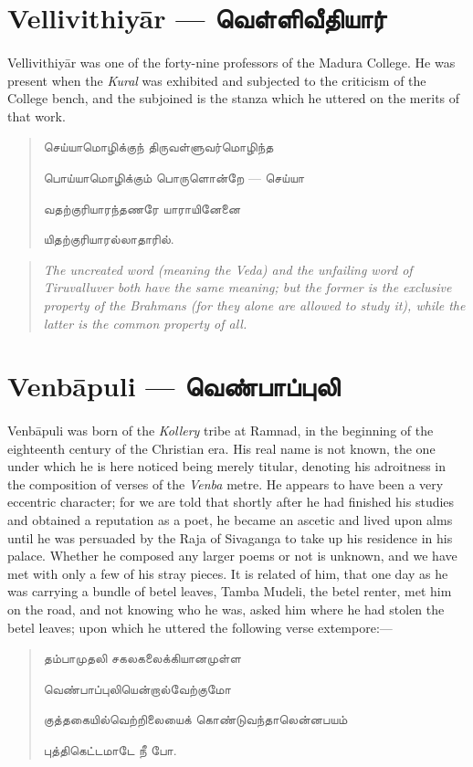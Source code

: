 \documentclass{article}
\newcommand{\TamilText}[1]{\texttamil{#1}}
\newcommand{\TamilBold}[1]{\texttamil{\textbf{#1}}}
\newcommand{\tam}[1]{\TamilText{#1}}
\newcommand{\tambold}[1]{\TamilBold{#1}}
\begin{document}
\section{Vellivithiy\={a}r --- \tambold{வெள்ளிவீதியார்}}
\paragraph{}
Vellivithiy\={a}r was one of the forty-nine professors of the Madura College. He was present when the \emph{Kural} was exhibited and subjected to the criticism of the College bench, and the subjoined is the stanza which he uttered on the merits of that work.
\begin{quotation}\small
\tam{செய்யாமொழிக்குந் திருவள்ளுவர்மொழிந்த}

\tam{பொய்யாமொழிக்கும்‌ பொருளொன்றே} --- \tam{செய்யா}

\tam{வதற்குரியாரந்தணரே யாராயினேனை}

\tam{யிதற்குரியாரல்லாதாரில்‌}.
\end{quotation}
\begin{quotation}\small
\emph{The uncreated word (meaning the Veda) and the unfailing word of Tiruvalluver both have the same meaning; but the former is the exclusive property of the Brahmans (for they alone are allowed to study it), while the latter is the common property of all.}
\end{quotation}

\section{Venb\={a}puli --- \tambold{வெண்பாப்புலி}}
\paragraph{}
Venb\={a}puli was born of the \emph{Kollery} tribe at Ramnad, in the beginning of the eighteenth century of the Christian era. His real name is not known, the one under which he is here noticed being merely titular, denoting his adroitness in the composition of verses of the \emph{Venba} metre. He appears to have been a very eccentric character; for we are told that shortly after he had finished his studies and obtained a reputation as a poet, he became an ascetic and lived upon alms until he was persuaded by the Raja of Sivaganga to take up his residence in his palace. Whether he composed any larger poems or not is unknown, and we have met with only a few of his stray pieces. It is related of him, that one day as he was carrying a bundle of betel leaves, Tamba Mudeli, the betel renter, met him on the road, and not knowing who he was, asked him where he had stolen the betel leaves; upon which he uttered the following verse extempore:---
\begin{quotation}\small
\tam{தம்பாமுதலி சகலகலைக்கியானமுள்ள}

\tam{வெண்பாப்புலியென்றால்வேற்குமோ}

\tam{குத்தகையில்வெற்றிலையைக்‌ கொண்டுவந்தாலென்னபயம்‌}

\tam{புத்திகெட்டமாடே நீ போ}.
\end{quotation}
\end{document}
